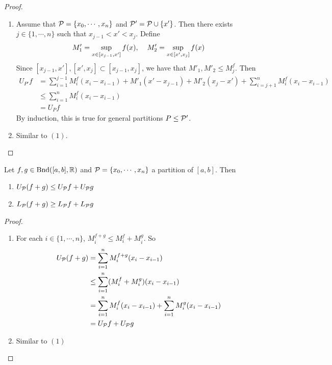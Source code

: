 \documentclass{book}
\begin{document}
	\begin{proof} \
		\begin{enumerate}
			\item Assume that $\mathcal{P} = \{x_0, \cdots, x_n\}$ and $\mathcal{P}' = \mathcal{P} \cup \{x'\}$. Then there exists $j \in \{1, \cdots, n\}$ such that $x_{j-1} < x' < x_j$. Define $$M'_1 = \sup_{x \in [x_{j-1}, x']} f(x), \hspace{.4cm} M'_2 = \sup_{x \in [x', x_{j}]} f(x)$$
			Since $[x_{j-1}, x'], [x', x_j] \subset [x_{j-1}, x_j]$, we have that $M'_1, M'_2 \leq  M^f_j$. Then 
			\begin{align*}
				U_{P'}f 
				&= \sum\limits_{i =1}^{j-1} M^f_i(x_i - x_{i-1}) + M'_1(x' - x_{j-1}) + M'_2(x_j - x') + \sum\limits_{i =j+1}^n M^f_i(x_i - x_{i-1})  \\
				&\leq   \sum\limits_{i =1}^{n} M^f_i(x_i - x_{i-1}) \\
				&= U_P f 
			\end{align*}
			By induction, this is true for general partitions $P \leq \mathcal{P}'$.
			\item Similar to $(1)$.
		\end{enumerate}
	\end{proof}
	
	\begin{ex}  
		Let $f, g \in \text{Bnd}([a,b], \mathbb{R})$ and $\mathcal{P} = \{x_0, \cdots, x_n\}$ a partition of $[a,b]$. Then 
		\begin{enumerate}
			\item $U_{\mathcal{P}}(f+g) \leq U_{\mathcal{P}} f + U_{\mathcal{P}} g$
			\item $L_{\mathcal{P}}(f+g) \geq L_{\mathcal{P}} f + L_{\mathcal{P}} g$
		\end{enumerate}
	\end{ex}
	
	\begin{proof} \
		\begin{enumerate}
			\item For each $i \in \{1, \cdots, n\}$, $M^{f+g}_i \leq M^f_i + M^g_i$. So 
			\begin{align*}
				U_{\mathcal{P}} (f+g) 
				&= \sum\limits_{i=1}^n M^{f+g}_i (x_i - x_{i-1}) \\
				& \leq \sum\limits_{i=1}^n (M^f_i + M^g_i)(x_i - x_{i-1}) \\
				&= \sum\limits_{i=1}^n M^f_i(x_i - x_{i-1}) + \sum\limits_{i=1}^n M^g_i(x_i - x_{i-1}) \\
				&= U_{\mathcal{P}} f + U_{\mathcal{P}} g
			\end{align*}
			\item Similar to $(1)$
		\end{enumerate}
	\end{proof}
	
\end{document}

